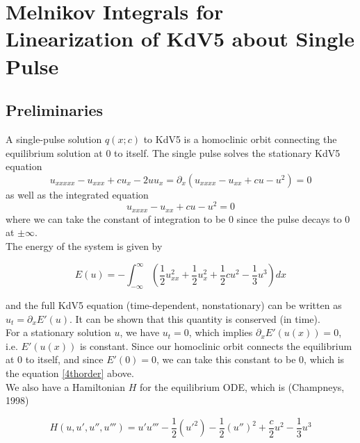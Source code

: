 \documentclass[12pt]{article}
\begin{document}
\section*{Melnikov Integrals for Linearization of KdV5 about Single Pulse}

\subsection*{Preliminaries}

A single-pulse solution $q(x; c)$ to KdV5 is a homoclinic orbit connecting the equilibrium solution at 0 to itself. The single pulse solves the stationary KdV5 equation
\begin{equation}
u_{xxxxx} - u_{xxx} + c u_x - 2 u u_x = \partial_x(u_{xxxx} - u_{xx} + c u - u^2) = 0
\end{equation}
as well as the integrated equation
\begin{equation}\label{4thorder}
u_{xxxx} - u_{xx} + c u - u^2 = 0
\end{equation}
where we can take the constant of integration to be 0 since the pulse decays to 0 at $\pm \infty$. \\

The energy of the system is given by 

\begin{equation} \label{energy}
E(u) = -\int_{-\infty}^{\infty} \left( \frac{1}{2}u_{xx}^2 + \frac{1}{2}u_x^2 + \frac{1}{2}cu^2 - \frac{1}{3}u^3 \right) dx
\end{equation}

and the full KdV5 equation (time-dependent, nonstationary) can be written as $u_t = \partial_x E'(u)$. It can be shown that this quantity is conserved (in time).\\

For a stationary solution $u$, we have $u_t = 0$, which implies $\partial_x E'(u(x)) = 0$, i.e. $E'(u(x))$ is constant. Since our homoclinic orbit connects the equilibrium at 0 to itself, and since $E'(0) = 0$, we can take this constant to be 0, which is the equation \eqref{4thorder} above. \\

We also have a Hamiltonian $H$ for the equilibrium ODE, which is (Champneys, 1998)

\begin{equation}\label{Hamiltonian}
H(u, u', u'', u''') = u'u''' - \frac{1}{2}(u'^2) - \frac{1}{2}(u'')^2 + \frac{c}{2}u^2 - \frac{1}{3}u^3 
\end{equation}
\end{document}
